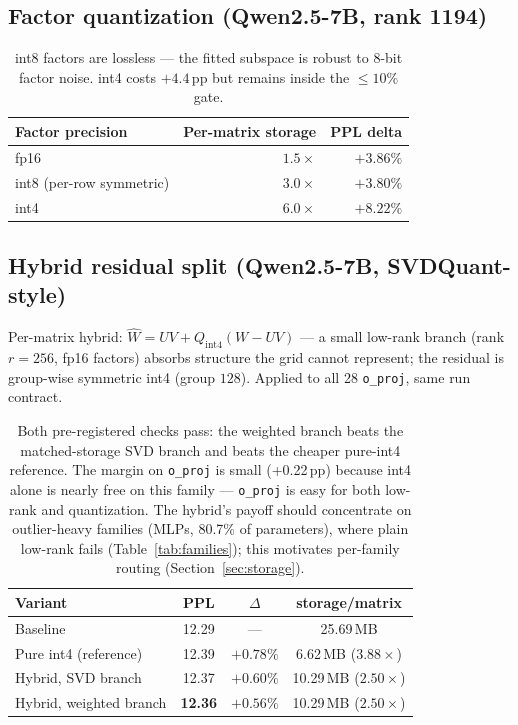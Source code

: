 \documentclass[11pt]{article}
\begin{document}
\subsection{Factor quantization (Qwen2.5-7B, rank 1194)}

\begin{table}[h]
\centering
\begin{tabular}{lrr}
\toprule
Factor precision & Per-matrix storage & PPL delta \\
\midrule
fp16                    & $1.5\times$ & $+3.86\%$ \\
int8 (per-row symmetric)& $3.0\times$ & $\mathbf{+3.80\%}$ \\
int4                    & $6.0\times$ & $+8.22\%$ \\
\bottomrule
\end{tabular}
\caption{int8 factors are lossless --- the fitted subspace is robust to
8-bit factor noise. int4 costs $+4.4$\,pp but remains inside the
$\le 10\%$ gate.}
\label{tab:factorquant}
\end{table}

\subsection{Hybrid residual split (Qwen2.5-7B, SVDQuant-style)}

Per-matrix hybrid: $\hat W = UV + Q_{\mathrm{int4}}(W - UV)$ --- a small
low-rank branch (rank $r=256$, fp16 factors) absorbs structure the grid
cannot represent; the residual is group-wise symmetric int4 (group $128$).
Applied to all 28 \texttt{o\_proj}, same run contract.

\begin{table}[h]
\centering
\begin{tabular}{lccc}
\toprule
Variant & PPL & $\Delta$ & storage/matrix \\
\midrule
Baseline                        & 12.29 & ---            & 25.69\,MB \\
Pure int4 (reference)           & 12.39 & $+0.78\%$      & 6.62\,MB ($3.88\times$) \\
Hybrid, SVD branch              & 12.37 & $+0.60\%$      & 10.29\,MB ($2.50\times$) \\
Hybrid, weighted branch         & \textbf{12.36} & $\mathbf{+0.56\%}$ & 10.29\,MB ($2.50\times$) \\
\bottomrule
\end{tabular}
\caption{Both pre-registered checks pass: the weighted branch beats the
matched-storage SVD branch and beats the cheaper pure-int4 reference. The
margin on \texttt{o\_proj} is small (+0.22\,pp) because int4 alone is
nearly free on this family --- \texttt{o\_proj} is easy for both low-rank
and quantization. The hybrid's payoff should concentrate on outlier-heavy
families (MLPs, 80.7\% of parameters), where plain low-rank fails
(Table~\ref{tab:families}); this motivates per-family routing
(Section~\ref{sec:storage}).}
\label{tab:hybrid}
\end{table}
\end{document}
